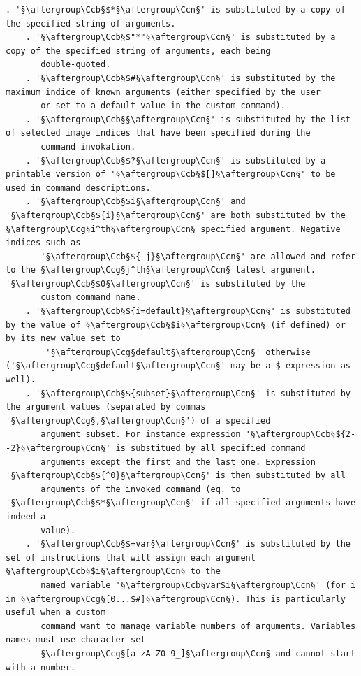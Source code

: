 \documentclass[a4paper,10.5pt,twoside]{book}
\def\Ccb{\color{cb}}
\def\Ccg{\color{cc}}
\def\Ccn{\color{black}}
\begin{document}
\begin{lstlisting}[escapechar=§]
    . '§\aftergroup\Ccb§$*§\aftergroup\Ccn§' is substituted by a copy of the specified string of arguments. 
    . '§\aftergroup\Ccb§$"*"§\aftergroup\Ccn§' is substituted by a copy of the specified string of arguments, each being 
       double-quoted. 
    . '§\aftergroup\Ccb§$#§\aftergroup\Ccn§' is substituted by the maximum indice of known arguments (either specified by the user 
       or set to a default value in the custom command). 
    . '§\aftergroup\Ccb§§\aftergroup\Ccn§' is substituted by the list of selected image indices that have been specified during the 
       command invokation. 
    . '§\aftergroup\Ccb§$?§\aftergroup\Ccn§' is substituted by a printable version of '§\aftergroup\Ccb§$[]§\aftergroup\Ccn§' to be used in command descriptions. 
    . '§\aftergroup\Ccb§$i§\aftergroup\Ccn§' and '§\aftergroup\Ccb§${i}§\aftergroup\Ccn§' are both substituted by the §\aftergroup\Ccg§i^th§\aftergroup\Ccn§ specified argument. Negative indices such as 
       '§\aftergroup\Ccb§${-j}§\aftergroup\Ccn§' are allowed and refer to the §\aftergroup\Ccg§j^th§\aftergroup\Ccn§ latest argument. '§\aftergroup\Ccb§$0§\aftergroup\Ccn§' is substituted by the 
       custom command name. 
    . '§\aftergroup\Ccb§${i=default}§\aftergroup\Ccn§' is substituted by the value of §\aftergroup\Ccb§$i§\aftergroup\Ccn§ (if defined) or by its new value set to 
        '§\aftergroup\Ccg§default§\aftergroup\Ccn§' otherwise ('§\aftergroup\Ccg§default§\aftergroup\Ccn§' may be a $-expression as well). 
    . '§\aftergroup\Ccb§${subset}§\aftergroup\Ccn§' is substituted by the argument values (separated by commas '§\aftergroup\Ccg§,§\aftergroup\Ccn§') of a specified 
       argument subset. For instance expression '§\aftergroup\Ccb§${2--2}§\aftergroup\Ccn§' is substitued by all specified command 
       arguments except the first and the last one. Expression '§\aftergroup\Ccb§${^0}§\aftergroup\Ccn§' is then substituted by all 
       arguments of the invoked command (eq. to '§\aftergroup\Ccb§$*§\aftergroup\Ccn§' if all specified arguments have indeed a 
       value). 
    . '§\aftergroup\Ccb§$=var§\aftergroup\Ccn§' is substituted by the set of instructions that will assign each argument §\aftergroup\Ccb§$i§\aftergroup\Ccn§ to the 
       named variable '§\aftergroup\Ccb§var$i§\aftergroup\Ccn§' (for i in §\aftergroup\Ccg§[0...$#]§\aftergroup\Ccn§). This is particularly useful when a custom 
       command want to manage variable numbers of arguments. Variables names must use character set 
       §\aftergroup\Ccg§[a-zA-Z0-9_]§\aftergroup\Ccn§ and cannot start with a number. 
 

\end{lstlisting}
\end{document}
